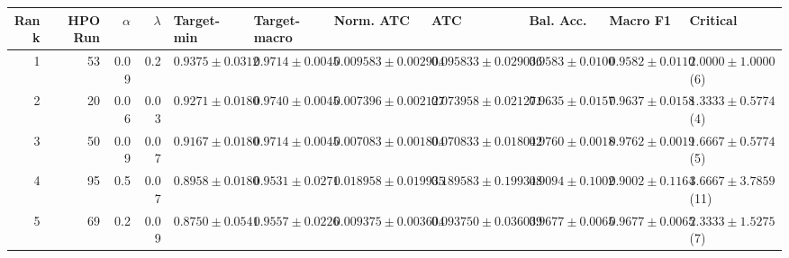 \begin{tabular}{r r r r l l l l l l l}
\toprule
Rank & HPO Run & $\alpha$ & $\lambda$ & Target-min & Target-macro & Norm. ATC & ATC & Bal. Acc. & Macro F1 & Critical \\
\midrule
1 & 53 & 0.09 & 0.2 & $0.9375 \pm 0.0312$ & $0.9714 \pm 0.0045$ & $0.009583 \pm 0.002904$ & $0.095833 \pm 0.029036$ & $0.9583 \pm 0.0100$ & $0.9582 \pm 0.0110$ & $2.0000 \pm 1.0000$ (6) \\
2 & 20 & 0.06 & 0.03 & $0.9271 \pm 0.0180$ & $0.9740 \pm 0.0045$ & $0.007396 \pm 0.002127$ & $0.073958 \pm 0.021271$ & $0.9635 \pm 0.0157$ & $0.9637 \pm 0.0158$ & $1.3333 \pm 0.5774$ (4) \\
3 & 50 & 0.09 & 0.07 & $0.9167 \pm 0.0180$ & $0.9714 \pm 0.0045$ & $0.007083 \pm 0.001804$ & $0.070833 \pm 0.018042$ & $0.9760 \pm 0.0018$ & $0.9762 \pm 0.0019$ & $1.6667 \pm 0.5774$ (5) \\
4 & 95 & 0.5 & 0.07 & $0.8958 \pm 0.0180$ & $0.9531 \pm 0.0271$ & $0.018958 \pm 0.019935$ & $0.189583 \pm 0.199348$ & $0.9094 \pm 0.1002$ & $0.9002 \pm 0.1164$ & $3.6667 \pm 3.7859$ (11) \\
5 & 69 & 0.2 & 0.09 & $0.8750 \pm 0.0541$ & $0.9557 \pm 0.0226$ & $0.009375 \pm 0.003604$ & $0.093750 \pm 0.036039$ & $0.9677 \pm 0.0065$ & $0.9677 \pm 0.0065$ & $2.3333 \pm 1.5275$ (7) \\
\bottomrule
\end{tabular}

